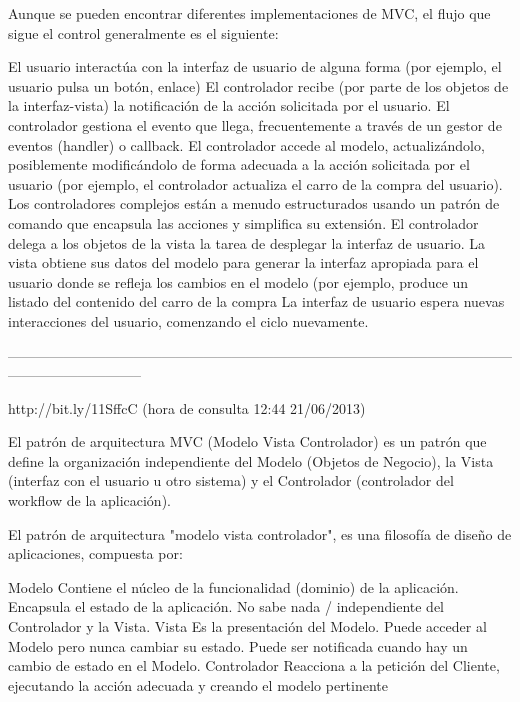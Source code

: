 Aunque se pueden encontrar diferentes implementaciones de MVC, el flujo que sigue el control generalmente es el siguiente:

    El usuario interactúa con la interfaz de usuario de alguna forma (por ejemplo, el usuario pulsa un botón, enlace)
    El controlador recibe (por parte de los objetos de la interfaz-vista) la notificación de la acción solicitada por el usuario. 
      El controlador gestiona el evento que llega, frecuentemente a través de un gestor de eventos (handler) o callback.
    El controlador accede al modelo, actualizándolo, posiblemente modificándolo de forma adecuada a la acción solicitada por el usuario 
      (por ejemplo, el controlador actualiza el carro de la compra del usuario). Los controladores complejos están a menudo estructurados 
      usando un patrón de comando que encapsula las acciones y simplifica su extensión.
    El controlador delega a los objetos de la vista la tarea de desplegar la interfaz de usuario. La vista obtiene sus datos del modelo 
      para generar la interfaz apropiada para el usuario donde se refleja los cambios en el modelo (por ejemplo, produce un listado del 
      contenido del carro de la compra
    La interfaz de usuario espera nuevas interacciones del usuario, comenzando el ciclo nuevamente.

 -----------------------------------------------------------------------------------------------------------------------------------------
 
 http://bit.ly/11SffcC (hora de consulta 12:44 21/06/2013)
 
 El patrón de arquitectura MVC (Modelo Vista Controlador) es un patrón que define la organización independiente del Modelo (Objetos de 
 Negocio), la Vista (interfaz con el usuario u otro sistema) y el Controlador (controlador del workflow de la aplicación).
 
 El patrón de arquitectura "modelo vista controlador", es una filosofía de diseño de aplicaciones, compuesta por:

Modelo
    Contiene el núcleo de la funcionalidad (dominio) de la aplicación. 
    Encapsula el estado de la aplicación. 
    No sabe nada / independiente del Controlador y la Vista. 
Vista
    Es la presentación del Modelo. 
    Puede acceder al Modelo pero nunca cambiar su estado. 
    Puede ser notificada cuando hay un cambio de estado en el Modelo. 
Controlador
    Reacciona a la petición del Cliente, ejecutando la acción adecuada y creando el modelo pertinente 
    
